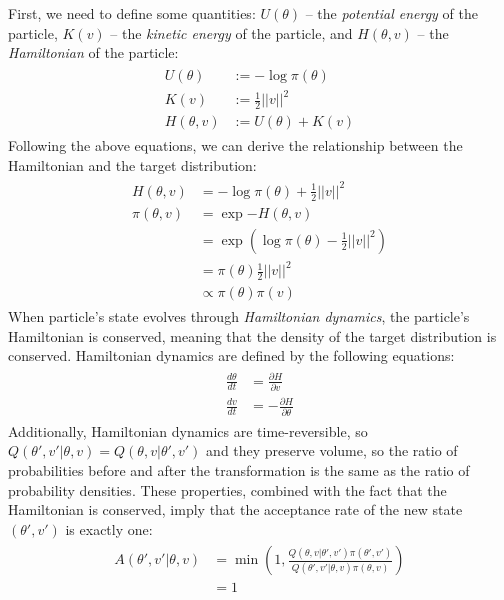 \documentclass[12pt]{article}
\begin{document}
First, we need to define some quantities: $U(\theta)$ -- the \textit{potential energy} of the particle, $K(v)$ -- the \textit{kinetic energy} of the particle, and $H(\theta, v)$ -- the \textit{Hamiltonian} of the particle:
\begin{align}
\begin{split}
U(\theta) &:= -\log \pi(\theta) \\
K(v) &:= \frac{1}{2} ||v||^2 \\
H(\theta, v) &:= U(\theta) + K(v)
\end{split}
\label{eq_hamiltonian}
\end{align}
Following the above equations, we can derive the relationship between the Hamiltonian and the target distribution:
\begin{align}
\begin{split}
H(\theta, v) &= -\log \pi(\theta) + \frac{1}{2}||v||^2 \\
\pi(\theta, v) &= \exp {-H(\theta, v)} \\
&= \exp \left(\log \pi(\theta) - \frac{1}{2}||v||^2 \right) \\
&= \pi(\theta) \frac{1}{2}||v||^2 \\
&\propto \pi(\theta) \pi(v)
\end{split}
\end{align}
When particle's state evolves through \textit{Hamiltonian dynamics}, the particle's Hamiltonian is conserved, meaning that the density of the target distribution is conserved. Hamiltonian dynamics are defined by the following equations:
\begin{align}
\begin{split}
\frac{d\theta}{dt} &= \frac{\partial H}{\partial v} \\
\frac{dv}{dt} &= -\frac{\partial H}{\partial \theta}
\end{split}
\label{eq_ham_dynamics}
\end{align}
Additionally, Hamiltonian dynamics are time-reversible, so $Q(\theta',v'|\theta,v) = Q(\theta,v|\theta',v')$ and they preserve volume, so the ratio of probabilities before and after the transformation is the same as the ratio of probability densities. These properties, combined with the fact that the Hamiltonian is conserved, imply that the acceptance rate of the new state $(\theta', v')$ is exactly one:
\begin{align}
\begin{split}
A(\theta',v'|\theta,v) &= \min \left(1, \frac{Q(\theta,v|\theta',v')\pi(\theta',v')}{Q(\theta',v'|\theta,v)\pi(\theta,v)} \right) \\
&= 1
\end{split}
\end{align}
\end{document}
